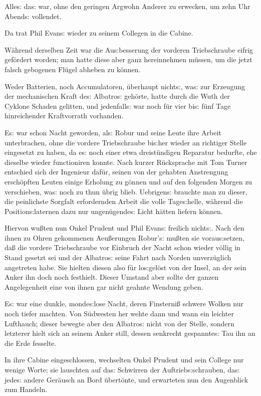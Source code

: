 \documentclass[oneside,12pt]{book}
\newcommand{\s}{s:}
\begin{document}
Alle{\s} da{\s} war, ohne den geringen Argwohn Anderer zu erwecken,
um zehn Uhr Abend{\s} vollendet.

Da trat Phil Evan{\s} wieder zu seinem Collegen in die Cabine.

W\"ahrend derselben Zeit war die Au{\s}besserung der vorderen
Triebschraube eifrig gef\"ordert worden; man hatte diese aber ganz
hereinnehmen m\"ussen, um die jetzt falsch gebogenen Fl\"ugel abheben
zu k\"onnen.

Weder Batterien, noch Accumulatoren, \"uberhaupt nicht{\s}, wa{\s}
zur Erzeugung der mechanischen Kraft de{\s} {\glqq}Albatro{\s}{\grqq}
geh\"orte, hatte durch die Wuth der Cyklone Schaden gelitten, und
jedenfall{\s} war noch f\"ur vier bi{\s} f\"unf Tage hinreichender
Kraftvorrath vorhanden.

E{\s} war schon Nacht geworden, al{\s} Robur und seine Leute ihre
Arbeit unterbrachen, ohne die vordere Triebschraube bi{\s}her wieder
an richtiger Stelle eingesetzt zu haben, da e{\s} noch einer etwa
dreist\"undigen Reparatur bedurfte, ehe dieselbe wieder functioniren
konnte. Nach kurzer R\"ucksprache mit Tom Turner entschied sich der
Ingenieur daf\"ur, seinen von der gehabten Anstrengung ersch\"opften
Leuten einige Erholung zu g\"onnen und auf den folgenden Morgen zu
verschieben, wa{\s} noch zu thun \"ubrig blieb. Uebrigen{\s} brauchte
man zu dieser, die peinlichste Sorgfalt erfordernden Arbeit die volle
Tage{\s}helle, w\"ahrend die Position{\s}laternen dazu nur
ungen\"ugende{\s} Licht h\"atten liefern k\"onnen.

Hiervon wu{\ss}ten nun Onkel Prudent und Phil Evan{\s} freilich
nicht{\s}. Nach den ihnen zu Ohren gekommenen Aeu{\ss}erungen
Robur'{\s} mu{\ss}ten sie vorau{\s}setzen, da{\ss} die vordere
Triebschraube vor Einbruch der Nacht schon wieder v\"ollig in Stand
gesetzt sei und der {\glqq}Albatro{\s}{\grqq} seine Fahrt nach Norden
unverz\"uglich angetreten habe. Sie hielten diesen also f\"ur
lo{\s}gel\"ost von der Insel, an der sein Anker ihn doch noch
festhielt. Dieser Umstand aber sollte der ganzen Angelegenheit eine
von ihnen gar nicht geahnte Wendung geben.

E{\s} war eine dunkle, monde{\s}lose Nacht, deren Finsterni{\ss}
schwere Wolken nur noch tiefer machten. Von S\"udwesten her wehte
dann und wann ein leichter Lufthauch; dieser bewegte aber den
{\glqq}Albatro{\s}{\grqq} nicht von der Stelle, sondern letzterer
hielt sich an seinem Anker still, dessen senkrecht gespannte{\s} Tau
ihn an die Erde fesselte.

In ihre Cabine eingeschlossen, wechselten Onkel Prudent und sein
College nur wenige Worte; sie lauschten auf da{\s} Schwirren der
Auftrieb{\s}schrauben, da{\s} jede{\s} andere Ger\"ausch an Bord
\"ubert\"onte, und erwarteten nun den Augenblick zum Handeln.
\end{document}
